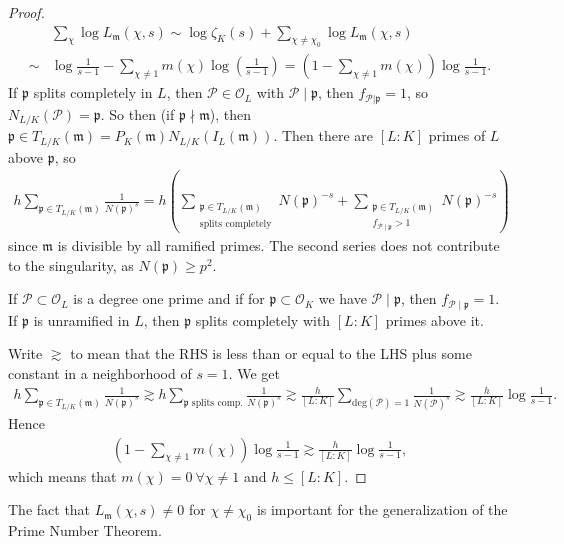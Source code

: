 \documentclass{article}
\theoremstyle{definition}
\begin{document}
\begin{proof}
    \begin{align*}
        &\sum_{\chi}^{} \log L_{\mathfrak{m}}(\chi,s) \sim \log \zeta_K(s) + \sum_{\chi \neq \chi_0}^{} \log L_{\mathfrak{m}}(\chi,s) \\
        \sim& \log \frac{1}{s-1} - \sum_{\chi \neq 1}^{} m(\chi)\log \left(\frac{1}{s-1}\right) = \left(1-\sum_{\chi \neq 1}^{} m(\chi)\right) \log\frac{1}{s-1}. 
    \end{align*}
    If $\mathfrak{p}$ splits completely in $L$, then $\mathcal{P} \in \mathcal{O}_L$ with $\mathcal{P} \mid \mathfrak{p}$, then $f_{\mathcal{P}|\mathfrak{p}}=1$, so $N_{L/K}(\mathcal{P})=\mathfrak{p}$. So then (if $\mathfrak{p}\nmid \mathfrak{m}$), then $\mathfrak{p} \in T_{L/K}(\mathfrak{m}) = P_{K}(\mathfrak{m})N_{L/K}(I_L(\mathfrak{m}))$. Then there are $[L:K]$ primes of $L$ above $\mathfrak{p}$, so
    \begin{align*}
        h \sum_{\mathfrak{p} \in T_{L/K}(\mathfrak{m})}^{} \frac{1}{N(\mathfrak{p})^s} = h \left(\sum_{\substack{\mathfrak{p} \in T_{L/K}(\mathfrak{m})\\\text{splits completely}}}^{}N(\mathfrak{p})^{-s} + \sum_{\substack{\mathfrak{p} \in T_{L/K}(\mathfrak{m})\\f_{\mathcal{P}\mid \mathfrak{p}}>1}}^{}N(\mathfrak{p})^{-s}\right) 
    \end{align*}
    since $\mathfrak{m}$ is divisible by all ramified primes. The second series does not contribute to the singularity, as $N(\mathfrak{p}) \ge p^2$.
    \vspace{1mm}
     
    If $\mathcal{P} \subset \mathcal{O}_L$ is a degree one prime and if for $\mathfrak{p} \subset \mathcal{O}_K$ we have $\mathcal{P} \mid \mathfrak{p}$, then $f_{\mathcal{P}\mid \mathfrak{p}} = 1$. If $\mathfrak{p}$ is unramified in $L$, then $\mathfrak{p}$ splits completely with $[L:K]$ primes above it.
    \vspace{1mm}
     
    Write $\gtrsim$ to mean that the RHS is less than or equal to the LHS plus some constant in a neighborhood of $s=1$. We get
    \begin{align*}
        h \sum_{\mathfrak{p} \in T_{L/K}(\mathfrak{m})}^{} \frac{1}{N(\mathfrak{p})^s} \gtrsim h \sum_{\mathfrak{p}\text{ splits comp.}}^{}  \frac{1}{N(\mathfrak{p})^s} \gtrsim \frac{h}{[L:K]} \sum_{\text{deg}(\mathcal{P})=1}^{} \frac{1}{N(\mathcal{P})^s} \gtrsim \frac{h}{[L:K]} \log\frac{1}{s-1}. 
    \end{align*}
    Hence
    \begin{align*}
        \left(1-\sum_{\chi \neq1}^{} m(\chi)\right)\log\frac{1}{s-1} \gtrsim\frac{h}{[L:K]} \log\frac{1}{s-1},
    \end{align*}
    which means that $m(\chi)=0 ~\forall \chi \neq 1$ and $h \le [L:K]$.
\end{proof}
The fact that $L_{\mathfrak{m}}(\chi,s) \neq 0$ for $\chi \neq \chi_0$ is important for the generalization of the Prime Number Theorem.
\end{document}
